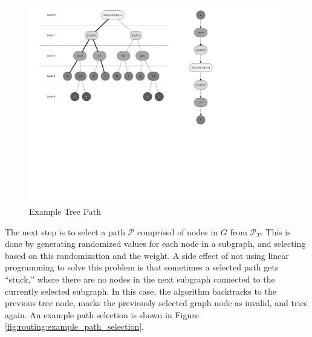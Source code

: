 \begin{landscape}
	\begin{figure}[ptb]
		\begin{centering}
			\includegraphics[width=8.5in]{Routing/Figures/routing-example_tree_path.pdf}
			\caption{Example Tree Path}
			\label{fig:routing:example_tree_path}
		\end{centering}
	\end{figure}
\end{landscape}

The next step is to select a path $\mathscr{P} $  comprised of nodes in $G$ from $\mathscr{P}_T $. This is done by generating randomized values for each node in a subgraph, and selecting based on this randomization and the weight. A side effect of not using linear programming to solve this problem is that sometimes a selected path gets ``stuck,'' where there are no nodes in the next subgraph connected to the currently selected subgraph. In this case, the algorithm backtracks to the previous tree node, marks the previously selected graph node as invalid, and tries again. An example path selection is shown in Figure \ref{fig:routing:example_path_selection}.

